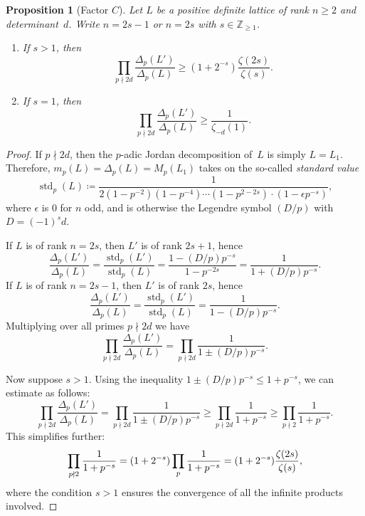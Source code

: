 \documentclass[a4paper]{amsart}
\theoremstyle{definition}
\theoremstyle{plain}
\newtheorem{proposition}[definition]{Proposition}
\DeclareMathOperator{\std}{std}
\newcommand{\IZ}{\mathbb{Z}}
\begin{document}
\begin{proposition}[Factor \(C\)] \label{prop:factor.C}
Let \(L\) be a positive definite lattice of rank \(n \geq 2\) and determinant~\(d\). Write \(n = 2s-1\) or \(n = 2s\) with \(s \in \IZ_{\geq 1}\). 
\begin{enumerate}
    \item[(a)] If \(s > 1\), then
\[
    \prod_{p \nmid 2d} \frac{\Delta_p(L')}{\Delta_p(L)} \geq (1 + 2^{-s}) \frac{\zeta(2s)}{\zeta(s)}. 
\]

\item[(b)] If \(s = 1\), then 
\[\prod_{p \nmid 2d} \frac{\Delta_p(L')}{\Delta_p(L)} \geq \frac{1}{\zeta_{-d}(1)}.\]
\end{enumerate}
\end{proposition}
\begin{proof}
    If \(p \nmid 2d\), then the \(p\)-adic Jordan decomposition of~\(L\) is simply \(L = L_1\). Therefore, \(m_p(L) = \Delta_p(L) = M_p(L_1)\) takes on the so-called \emph{standard value} 
    \[
        \std_p(L) \coloneqq \frac{1}{2(1-p^{-2})(1-p^{-4})\cdots (1-p^{2-2s})\cdot (1-\epsilon p^{-s})},
    \]
    where \(\epsilon\) is \(0\) for \(n\) odd, and is otherwise the Legendre symbol \((D/p)\) with \(D = (-1)^s d\).

    If \(L\) is of rank \(n = 2s\), then \(L'\) is of rank \(2s+1\), hence
    \[
        \frac{\Delta_p(L')}{\Delta_p(L)} = \frac{\std_p(L')}{\std_p(L)} = \frac{1 - (D/p) p^{-s}}{1 - p^{-2s}}=\frac{1}{1+(D/p)p^{-s}}.
    \]
    If \(L\) is of rank \(n = 2s-1\), then \(L'\) is of rank \(2s\), hence
    \[
        \frac{\Delta_p(L')}{\Delta_p(L)} = \frac{\std_p(L')}{\std_p(L)} = \frac{1}{1 - (D/p) p^{-s}}.
    \]
    Multiplying over all primes \(p \nmid 2d\) we have
    \[
        \prod_{p \nmid 2d} \frac{\Delta_p(L')}{\Delta_p(L)} = \prod_{p \nmid 2d} \frac{1}{1 \pm (D/p) p^{-s}}.
    \]

    Now suppose \( s > 1 \). Using the inequality \( 1 \pm (D/p)p^{-s} \leq 1 + p^{-s} \), we can estimate as follows:
    \begin{equation*}
    \prod_{p \nmid 2d} \frac{\Delta_p(L')}{\Delta_p(L)} 
    = \prod_{p \nmid 2d} \frac{1}{1 \pm (D/p)p^{-s}} 
    \geq \prod_{p \nmid 2d} \frac{1}{1 + p^{-s}} 
    \geq \prod_{p \nmid 2} \frac{1}{1 + p^{-s}}.
    \end{equation*}
    This simplifies further:
    \begin{equation*}
    \prod_{p \nmid 2} \frac{1}{1 + p^{-s}} 
    = (1 + 2^{-s}) \prod_{p} \frac{1}{1 + p^{-s}} \\
    = (1 + 2^{-s}) \frac{\zeta(2s)}{\zeta(s)},
\end{equation*}
where the condition \( s > 1 \) ensures the convergence of all the infinite products involved.


\end{proof}
\end{document}
